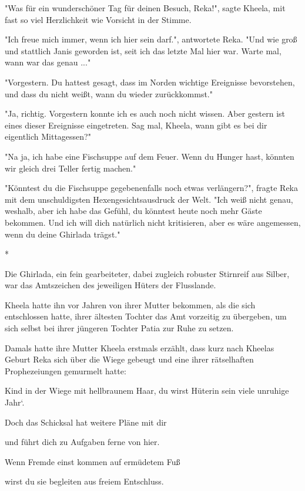 \documentclass[10pt, a4paper, oneside]{book}
\begin{document}
\begin{multicols}{2}
"Was für ein wunderschöner Tag für deinen Besuch, Reka!", sagte Kheela, mit fast so viel Herzlichkeit wie Vorsicht in der Stimme. 

"Ich freue mich immer, wenn ich hier sein darf.", antwortete Reka. "Und wie groß und stattlich Janis geworden ist, seit ich das letzte Mal hier war. Warte mal, wann war das genau ..." 

"Vorgestern. Du hattest gesagt, dass im Norden wichtige Ereignisse bevorstehen, und dass du nicht weißt, wann du wieder zurückkommst." 

"Ja, richtig. Vorgestern konnte ich es auch noch nicht wissen. Aber gestern ist eines dieser Ereignisse eingetreten. Sag mal, Kheela, wann gibt es bei dir eigentlich Mittagessen?" 

"Na ja, ich habe eine Fischsuppe auf dem Feuer. Wenn du Hunger hast, könnten wir gleich drei Teller fertig machen." 

"Könntest du die Fischsuppe gegebenenfalls noch etwas verlängern?", fragte Reka mit dem unschuldigsten Hexengesichtsausdruck der Welt. "Ich weiß nicht genau, weshalb, aber ich habe das Gefühl, du könntest heute noch mehr Gäste bekommen. Und ich will dich natürlich nicht kritisieren, aber es wäre angemessen, wenn du deine Ghirlada trägst." 

\begin{center}
    * 
\end{center}

Die Ghirlada, ein fein gearbeiteter, dabei zugleich robuster Stirnreif aus Silber, war das Amtszeichen des jeweiligen Hüters der Flusslande.

Kheela hatte ihn vor Jahren von ihrer Mutter bekommen, als die sich entschlossen hatte, ihrer ältesten Tochter das Amt vorzeitig zu übergeben, um sich selbst bei ihrer jüngeren Tochter Patia zur Ruhe zu setzen. 

Damals hatte ihre Mutter Kheela erstmals erzählt, dass kurz nach Kheelas Geburt Reka sich über die Wiege gebeugt und eine ihrer rätselhaften Prophezeiungen gemurmelt hatte: 

Kind in der Wiege mit hellbraunem Haar, du wirst Hüterin sein viele unruhige Jahr‘. 

Doch das Schicksal hat weitere Pläne mit dir

und führt dich zu Aufgaben ferne von hier.

Wenn Fremde einst kommen auf ermüdetem Fuß 

wirst du sie begleiten aus freiem Entschluss. 


\end{multicols}
\end{document}
